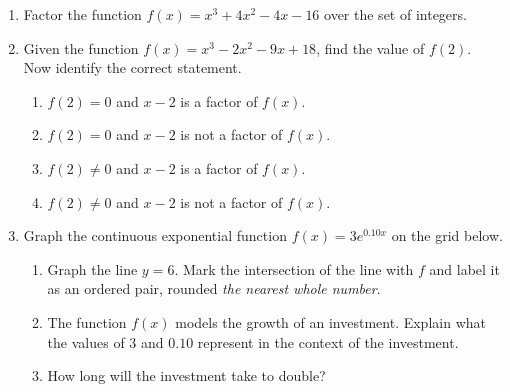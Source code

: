 \documentclass[12pt, twoside]{article}
\begin{document}
\begin{enumerate}[itemsep=0.5cm]
\newpage
\item Factor the function $f(x) = x^3+4x^2-4x-16$ over the set of integers. \vspace{10cm}

\item Given the function $f(x) = x^3-2x^2-9x+18$, find the value of $f(2)$.\\[5cm]
Now identify the correct statement.
\begin{enumerate}
    \item $f(2)=0$ and $x-2$ is a factor of $f(x)$.
    \item $f(2)=0$ and $x-2$ is not a factor of $f(x)$.
    \item $f(2) \ne 0$ and $x-2$ is a factor of $f(x)$.
    \item $f(2) \ne 0$ and $x-2$ is not a factor of $f(x)$.
\end{enumerate}

\newpage
\item Graph the continuous exponential function $f(x) = 3e^{0.10x}$ on the grid below. 
\begin{center}
    \end{center}
    \begin{enumerate}
        \item Graph the line $y=6$. Mark the intersection of the line with $f$ and label it as an ordered pair, rounded \emph{the nearest whole number}.
        \item The function $f(x)$ models the growth of an investment. Explain what the values of $3$ and $0.10$ represent in the context of the investment. \vspace{4cm}
        \item How long will the investment take to double? 
    \end{enumerate}

\end{enumerate}
\end{document}

